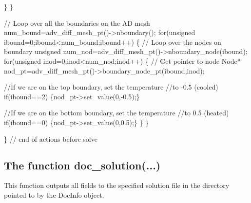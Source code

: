 \begin{DoxyCodeInclude}
    \}
  \}

 \textcolor{comment}{// Loop over all the boundaries on the AD mesh}
 num\_bound=adv\_diff\_mesh\_pt()->nboundary();
 \textcolor{keywordflow}{for}(\textcolor{keywordtype}{unsigned} ibound=0;ibound<num\_bound;ibound++)
  \{
   \textcolor{comment}{// Loop over the nodes on boundary }
   \textcolor{keywordtype}{unsigned} num\_nod=adv\_diff\_mesh\_pt()->nboundary\_node(ibound);
   \textcolor{keywordflow}{for}(\textcolor{keywordtype}{unsigned} inod=0;inod<num\_nod;inod++)
    \{
     \textcolor{comment}{// Get pointer to node}
     Node* nod\_pt=adv\_diff\_mesh\_pt()->boundary\_node\_pt(ibound,inod);

     \textcolor{comment}{//If we are on the top boundary, set the temperature }
     \textcolor{comment}{//to -0.5 (cooled)}
     \textcolor{keywordflow}{if}(ibound==2) \{nod\_pt->set\_value(0,-0.5);\}

     \textcolor{comment}{//If we are on the bottom boundary, set the temperature}
     \textcolor{comment}{//to 0.5 (heated)}
     \textcolor{keywordflow}{if}(ibound==0) \{nod\_pt->set\_value(0,0.5);\}
    \}
  \}


\}  \textcolor{comment}{// end of actions before solve}

\end{DoxyCodeInclude}




\hypertarget{index_doc_solution}{}\subsection{The function doc\+\_\+solution(...)}\label{index_doc_solution}
This function outputs all fields to the specified solution file in the directory pointed to by the {\ttfamily Doc\+Info} object.

